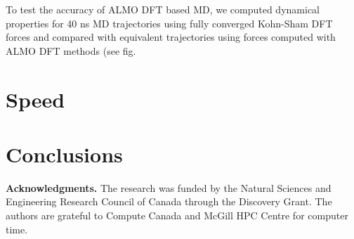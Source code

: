 \documentclass[10pt,aps,prl,twocolumn,amsmath,amssymb,superscriptaddress,longbibliography]{revtex4-1}
\begin{document}
To test the accuracy of ALMO DFT based MD, we computed dynamical properties for 40 ns MD trajectories using fully converged Kohn-Sham DFT forces and compared with equivalent trajectories using forces computed with ALMO DFT methods (see fig. %

\section{Speed}

\section{Conclusions} 

\textbf{Acknowledgments.} The research was funded by the Natural Sciences and Engineering Research Council of Canada through the Discovery Grant. The authors are grateful to Compute Canada and McGill HPC Centre for computer time.



\end{document}
